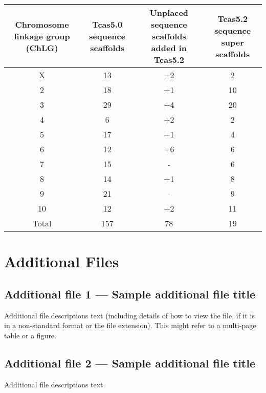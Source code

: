 \documentclass{bmcart}
\begin{document}
\begin{backmatter}
\begin{table}[h!]
\begin{tabular}{cccc}
		\hline
		Chromosome linkage group (ChLG) & Tcas5.0 sequence scaffolds & Unplaced sequence scaffolds added in Tcas5.2 & Tcas5.2 sequence super scaffolds \\ \hline
		X & 13 & +2 & 2\\
		2 & 18 & +1 & 10\\
		3 & 29 & +4 & 20\\
		4 & 6 & +2 & 2\\
		5 & 17 & +1 & 4\\
		6 & 12 & +6 & 6\\
		7 & 15 & - & 6\\
		8 & 14 & +1 & 8\\
		9 & 21 & - & 9\\
		10 & 12 & +2 & 11\\ \hline
		Total & 157 & 78 & 19\\ \hline
	\end{tabular}
\end{table}




\section*{Additional Files}
  \subsection*{Additional file 1 --- Sample additional file title}
    Additional file descriptions text (including details of how to
    view the file, if it is in a non-standard format or the file extension).  This might
    refer to a multi-page table or a figure.

  \subsection*{Additional file 2 --- Sample additional file title}
    Additional file descriptions text.


\end{backmatter}
\end{document}
